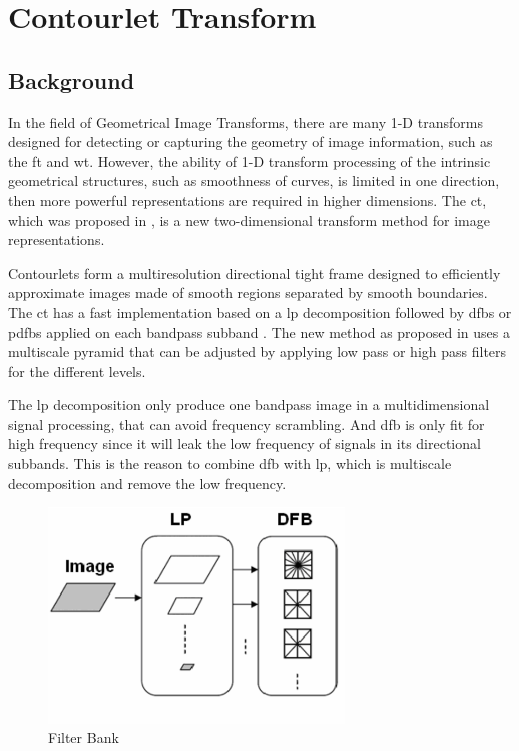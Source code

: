 \section{Contourlet Transform}

\subsection{Background}
In the field of Geometrical Image Transforms, there are many 1-D transforms designed for detecting or capturing the geometry of image information, such as the \gls{ft} and \gls{wt}. However, the ability of 1-D transform processing of the intrinsic geometrical structures, such as smoothness of curves, is limited in one direction, then more powerful representations are required in higher dimensions. The \gls{ct}, which was proposed in \cite{do2005contourlet}, is a new two-dimensional transform method for image representations.

Contourlets form a multiresolution directional tight frame designed to efficiently approximate images made of smooth regions separated by smooth boundaries. The \gls{ct} has a fast implementation based on a \gls{lp} decomposition followed by \glspl{dfb} or \glspl{pdfb} applied on each bandpass subband \cite{suresh2014artificial}. The new method as proposed in \cite{lu2006new} uses a multiscale pyramid that can be adjusted by applying low pass or high pass filters for the different levels.

The \gls{lp} decomposition only produce one bandpass image in a multidimensional signal processing, that can avoid frequency scrambling. And \gls{dfb} is only fit for high frequency since it will leak the low frequency of signals in its directional subbands. This is the reason to combine \gls{dfb} with \gls{lp}, which is multiscale decomposition and remove the low frequency.

\begin{figure}[h]
	\centering
	\includegraphics[width=0.7\textwidth]{fig/contourlet}
	\caption[Contourlet Transform - Filter Bank]{Filter Bank}
	\label{fig:contourlet}
\end{figure}


